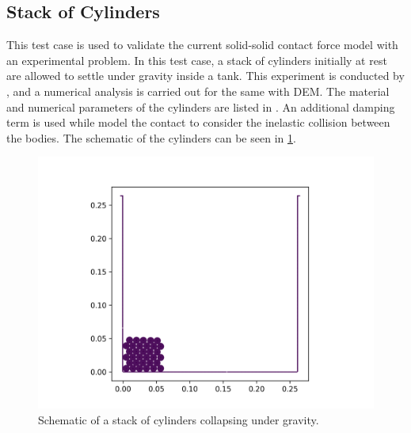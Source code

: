 \FloatBarrier%
\subsection{Stack of Cylinders}
\label{sec:stack-of-cylinders}
This test case is used to validate the current solid-solid contact force model
with an experimental problem. In this test case, a stack of cylinders initially
at rest are allowed to settle under gravity inside a tank. This experiment is
conducted by \parencite{zhang_simulation_2009}, and a numerical analysis is carried
out for the same with DEM. The material and numerical parameters of the
cylinders are listed in . An additional damping
term is used while model the contact to consider the inelastic collision between
the bodies. The schematic of the cylinders can be seen in
\cref{fig:schematic:stack-of-cylinders}.
\begin{figure}[!htpb]
  \centering
  \includegraphics[scale=0.5]{figures/rfc/figures/stack_of_cylinders_2d/Mohseni_Vyas/time0}
  \caption{Schematic of a stack of cylinders collapsing under gravity.}
  \label{fig:schematic:stack-of-cylinders}
\end{figure}


